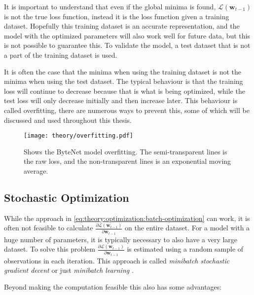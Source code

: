 It is important to understand that even if the global minima is found, $\mathcal{L}(\mathbf{w}_{t-1})$ is not the true loss function, instead it is the loss function given a training dataset. Hopefully this training dataset is an accurate representation, and the model with the optimized parameters will also work well for future data, but this is not possible to guarantee this. To validate the model, a test dataset that is not a part of the training dataset is used.

It is often the case that the minima when using the training dataset is not the minima when using the test dataset. The typical behaviour is that the training loss will continue to decrease because that is what is being optimized, while the test loss will only decrease initially and then increase later. This behaviour is called overfitting, there are numerous ways to prevent this, some of which will be discussed and used throughout this thesis.

\begin{figure}[h]
    \centering
    \texttt{[image: theory/overfitting.pdf]}
    \caption{Shows the ByteNet model overfitting. The semi-transparent lines is the raw loss, and the non-transparent lines is an exponential moving average.}
\end{figure}

\subsection{Stochastic Optimization}

While the approach in \eqref{eq:theory:optimization:batch-optimization} can work, it is often not feasible to calculate $\frac{\partial \mathcal{L}(\mathbf{w}_{t-1})}{\partial \mathbf{w}_{t-1}}$ on the entire dataset. For a model with a huge number of parameters, it is typically necessary to also have a very large dataset. To solve this problem $\frac{\partial \mathcal{L}(\mathbf{w}_{t-1})}{\partial \mathbf{w}_{t-1}}$ is estimated using a random sample of observations in each iteration. This approach is called \textit{minibatch stochastic gradient decent} or just \textit{minibatch learning} \cite{deep-learning}.

Beyond making the computation feasible this also has some advantages:

